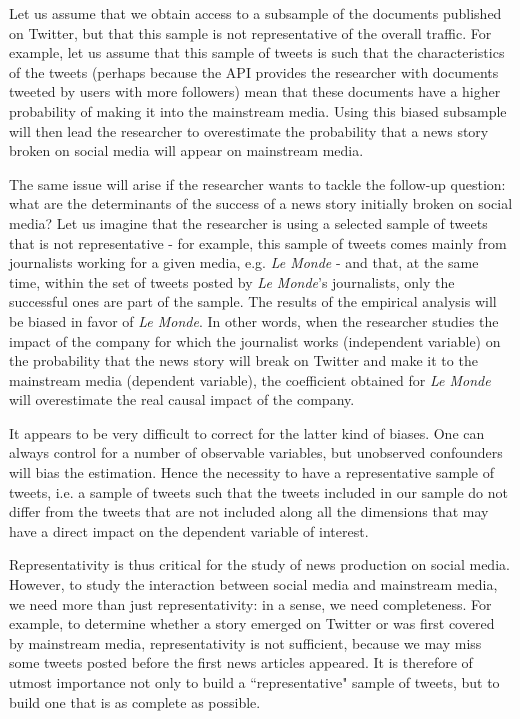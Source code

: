 Let us assume that we obtain access to a subsample of the documents published on Twitter,
but that this sample is not representative of the overall traffic. For example, let us assume that this sample of tweets is
such that the characteristics of the tweets (perhaps because the API provides the researcher with documents tweeted by
users with more followers) mean that these documents have a higher probability of making it into the mainstream media.
Using this biased subsample will then lead the researcher to overestimate the probability that a news story broken on
social media will appear on mainstream media.


The same issue will arise if the researcher wants to tackle the follow-up question: what are the determinants of the
success of a news story initially broken on social media? Let us imagine that the researcher is using a selected sample of
tweets that is not representative - for example, this sample of tweets comes mainly from journalists working
for a given media, e.g. \textit{Le Monde} - and that, at the same time, within the set of tweets posted by
\textit{Le Monde}’s journalists, only the successful ones are part of the sample. The results of the empirical
analysis will be biased in favor of \textit{Le Monde}. In other words, when the researcher studies the impact of the
company for which the journalist works (independent variable) on the probability that the news story will break on Twitter and
make it to the mainstream media (dependent variable), the coefficient obtained for \textit{Le Monde} will overestimate the
real causal impact of the company.


It appears to be very difficult to correct for the latter kind of biases. One can always control for a number of observable variables,
but unobserved confounders will bias the estimation.
Hence the necessity to have a representative sample of tweets, i.e. a sample of tweets such that the tweets included in
our sample do not differ from the tweets that are not included along all the dimensions that may have a direct impact on
the dependent variable of interest.

Representativity is thus critical for the study of news production on social media.
However, to study the interaction between social media and mainstream media, we need more than just representativity: in a sense, we need completeness.
For example, to determine whether a story emerged on Twitter or was first covered by mainstream media, representativity is not sufficient, because we may miss some tweets posted before the first
news articles appeared. It is therefore of utmost importance not only to build a ``representative" sample of tweets, but to build
one that is as complete as possible.

